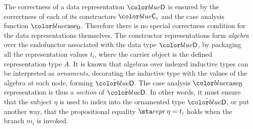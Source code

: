 The correctness of a data representation $\lab{D}$ is ensured by the
correctness of each of its constructors $\lab{C}_i$ and the case analysis
function $\caselab{D}$. Therefore there is no special correctness condition for
the data representations themselves. The constructor representations form
\emph{algebra} over the endofunctor associated with the data type $\lab{D}$, by
packaging all the representation values $t_i$, where the carrier object is the
defined representation type $A$. It is known that algebras over indexed
inductive types can be interpreted as \emph{ornaments}, decorating the
inductive type with the values of the algebra at each node, forming
$\tilde{\lab{D}}$. The case analysis $\caselab{D}$ representation is thus a
\emph{section} of $\tilde{\lab{D}}$. In other words, it must ensure that the
subject $\eta$ is used to index into the ornamented type $\tilde{\lab{D}}$, or
put another way, that the propositional equality $\Trepr{\eta} = t_i$ holds
when the branch $m_i$ is invoked.

